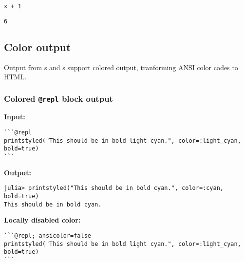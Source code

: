 \begin{verbatim}
x + 1
\end{verbatim}


\begin{verbatim}
6
\end{verbatim}



\subsection{Color output}



\label{17347250707405175741}{}


Output from s and s support colored output, tranforming ANSI color codes to HTML.



\subsubsection{Colored \texttt{@repl} block output}



\label{681009610151884915}{}


\textbf{Input:}




\begin{verbatim}
```@repl
printstyled("This should be in bold light cyan.", color=:light_cyan, bold=true)
```
\end{verbatim}



\textbf{Output:}




\begin{verbatim}
julia> printstyled("This should be in bold cyan.", color=:cyan, bold=true)
This should be in bold cyan.
\end{verbatim}



\textbf{Locally disabled color:}




\begin{verbatim}
```@repl; ansicolor=false
printstyled("This should be in bold light cyan.", color=:light_cyan, bold=true)
```
\end{verbatim}




